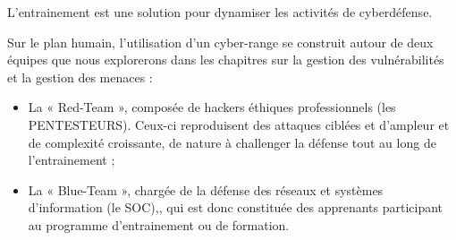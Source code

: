 L'entrainement est une solution pour dynamiser les activités de cyberdéfense.





Sur le plan humain,  l'utilisation d'un cyber-range se construit autour de deux équipes que nous explorerons dans les chapitres sur la gestion des vulnérabilités et la gestion des menaces :

\begin{itemize}
  \item La « Red-Team », composée de hackers éthiques professionnels (les PENTESTEURS). Ceux-ci reproduisent des attaques ciblées et d’ampleur et de complexité croissante, de nature à challenger la défense tout au long de l’entrainement ;
  \item  La « Blue-Team », chargée de la défense des réseaux et systèmes d’information (le SOC),, qui est donc constituée des apprenants participant au programme d’entrainement ou de formation.
\end{itemize}






